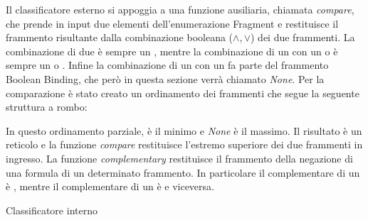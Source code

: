 \documentclass[./main.tex]{subfiles}
\begin{document}
Il classificatore esterno si appoggia a una funzione ausiliaria, chiamata \textit{compare}, che prende in input due elementi 
dell'enumerazione Fragment e restituisce il frammento risultante dalla combinazione booleana ($\land, \lor$) dei due frammenti.
La combinazione di due \ob è sempre un \ob, mentre la combinazione di un \ob con un \cb o \dbb è sempre un \cb o \dbb.
Infine la combinazione di un \cb con un \dbb fa parte del frammento Boolean Binding, che però in questa sezione verrà chiamato \textit{None}.
Per la comparazione è stato creato un ordinamento dei frammenti che segue la seguente struttura a rombo:

\begin{center}
\end{center}

In questo ordinamento parziale, \ob è il minimo e \textit{None} è il massimo.
Il risultato è un reticolo e la funzione \textit{compare} restituisce l'estremo superiore dei due frammenti in ingresso.
La funzione \textit{complementary} restituisce il frammento della negazione di una formula di un determinato frammento.
In particolare il complementare di un \ob è \ob, mentre il complementare di un \cb è \dbb e viceversa.



\begin{algorithm}[H] \label{alg:innerClassifier}
    \caption{Classificatore interno}


\end{algorithm}
\end{document}
